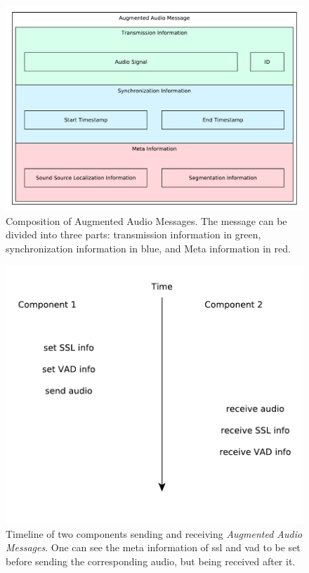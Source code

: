 \begin{figure}[]
	\centering
	\includegraphics[width=\textwidth]{bilder/rosmsg/augmented_audio.pdf}
	\caption{Composition of Augmented Audio Messages.
		The message can be divided into three parts:
		transmission information in green, synchronization information in blue, and Meta information in red.}
	\label{pic:main:lib:augmented_audio}
\end{figure}

\begin{figure}[]
	\centering
	\includegraphics[width=\textwidth]{diagrams/lib_ssl_vad_time.pdf}
	\caption{Timeline of two components sending and receiving \textit{Augmented Audio Messages}.
		One can see the meta information of \gls{ssl} and \gls{vad} to be set before sending the corresponding audio, but being received after it.}
	\label{pic:main:lib:ssl_vad_time}
\end{figure}

